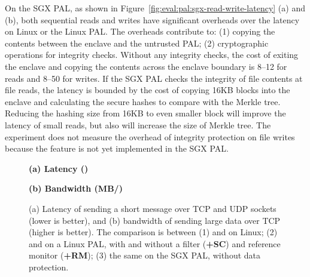 On the SGX PAL,
as shown in
Figure~\ref{fig:eval:pal:sgx-read-write-latency} (a) and (b), both sequential reads and writes
have significant overheads over the latency on Linux or the Linux PAL.
The overheads contribute to:
(1) copying the contents between the enclave and the untrusted PAL; (2) cryptographic operations for 
integrity checks. Without any integrity checks,
the cost of exiting the enclave
and copying the contents across the enclave boundary is
8--12 \usec{} for reads and 8--50 \usec{} for writes.
If the SGX PAL checks the integrity of file contents
at file reads,
the latency is bounded by
the cost of copying 16KB blocks into the enclave
and calculating the secure hashes to compare with the Merkle tree.
Reducing the hashing size from 16KB to even smaller block
will improve
the latency of small reads,
but also will increase the size of Merkle tree.
The experiment does not measure the overhead of integrity protection on file writes
because the feature is not yet implemented
in the SGX PAL.











\begin{figure*}[t!]
\centering
\footnotesize
{}
\parbox{0.24\textwidth}{\quad}
\parbox{0.49\textwidth}{\centering\bf (a) Latency ({\usec})}
\parbox{0.24\textwidth}{\centering\bf (b) Bandwidth (MB/\asec{})}
\caption{(a) Latency of sending a short message over TCP and UDP sockets (lower is better), and (b) bandwidth of sending large data over TCP (higher is better).
The comparison is between (1)  and  on Linux; (2)  and  on a Linux PAL, with and without a \seccomp{} filter ({\bf +SC}) and reference monitor ({\bf +RM}); (3) the same \hostapis{} on the SGX PAL, without data protection.}
\label{fig:eval:pal:network-latency-bandwidth}
\end{figure*}




